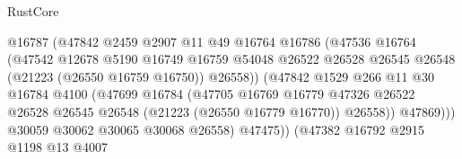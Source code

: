 \begin{lexlean}{RustCore}
\begin{coremodule}
                                      @16787
                                      (@47842
                                        @2459
                                        @2907
                                        @11
                                        @49
                                        @16764
                                        @16786
                                        (@47536
                                          @16764
                                          (@47542
                                            @12678
                                            @5190
                                            @16749
                                            @16759
                                            @54048
                                            @26522
                                            @26528
                                            @26545
                                            @26548
                                            (@21223 (@26550 @16759 @16750))
                                            @26558))
                                        (@47842
                                          @1529
                                          @266
                                          @11
                                          @30
                                          @16784
                                          @4100
                                          (@47699
                                            @16784
                                            (@47705
                                              @16769
                                              @16779
                                              @47326
                                              @26522
                                              @26528
                                              @26545
                                              @26548
                                              (@21223 (@26550 @16779 @16770))
                                              @26558))
                                          @47869)))
                                    @30059
                                    @30062
                                    @30065
                                    @30068
                                    @26558)
                                  @47475))
                              (@47382
                                @16792
                                @2915
                                @1198
                                @13
                                @4007

\end{coremodule}
\end{lexlean}
